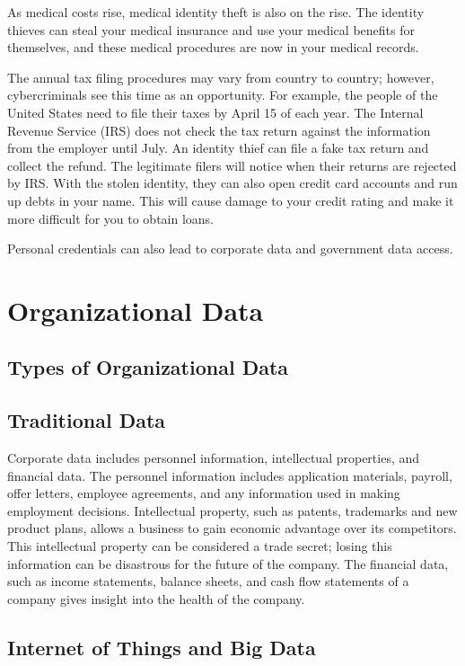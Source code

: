 \documentclass{article}
\begin{document}
As medical costs rise, medical identity theft is also on the rise. The identity thieves can steal your medical insurance and use your medical benefits for themselves, and these medical procedures are now in your medical records.

The annual tax filing procedures may vary from country to country; however, cybercriminals see this time as an opportunity. For example, the people of the United States need to file their taxes by April 15 of each year. The Internal Revenue Service (IRS) does not check the tax return against the information from the employer until July. An identity thief can file a fake tax return and collect the refund. The legitimate filers will notice when their returns are rejected by IRS. With the stolen identity, they can also open credit card accounts and run up debts in your name. This will cause damage to your credit rating and make it more difficult for you to obtain loans.

Personal credentials can also lead to corporate data and government data access.

\section{Organizational Data}
\subsection{Types of Organizational Data}
\subsection*{Traditional Data}

Corporate data includes personnel information, intellectual properties, and financial data. The personnel information includes application materials, payroll, offer letters, employee agreements, and any information used in making employment decisions. Intellectual property, such as patents, trademarks and new product plans, allows a business to gain economic advantage over its competitors. This intellectual property can be considered a trade secret; losing this information can be disastrous for the future of the company. The financial data, such as income statements, balance sheets, and cash flow statements of a company gives insight into the health of the company.
\subsection*{Internet of Things and Big Data}
\end{document}
